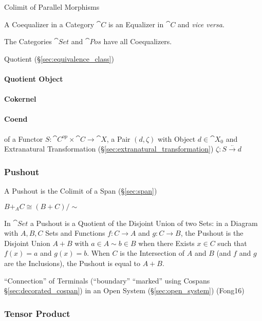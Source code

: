 Colimit of Parallel Morphisms

A Coequalizer in a Category $\cat{C}$ is an Equalizer in
$\cat{C}$ and \emph{vice versa}.

The Categories $\cat{Set}$ and $\cat{Pos}$ have all
Coequalizers.

Quotient (\S\ref{sec:equivalence_class})



\paragraph{Quotient Object}\label{sec:quotient_object}\hfill

\paragraph{Cokernel}\label{sec:cokernel}\hfill

\paragraph{Coend}\label{sec:coend}\hfill

of a Functor $S : \cat{C}^{op} \times \cat{C} \rightarrow
\cat{X}$, a Pair $(d, \zeta)$ with Object $d \in \cat{X}_0$ and
Extranatural Transformation (\S\ref{sec:extranatural_transformation})
$\zeta : S \xrightarrow{..} d$



\subsubsection{Pushout}\label{sec:pushout}

A Pushout is the Colimit of a Span (\S\ref{sec:span})

$B +_A C \cong (B + C)/\sim$

In $\cat{Set}$ a Pushout is a Quotient of the Disjoint Union of two
Sets: in a Diagram with $A,B,C$ Sets and Functions $f : C \rightarrow
A$ and $g : C \rightarrow B$, the Pushout is the Disjoint Union $A +
B$ with $a \in A \sim b \in B$ when there Exists $x \in C$ such that
$f(x) = a$ and $g(x) = b$. When $C$ is the Intersection of $A$ and $B$
(and $f$ and $g$ are the Inclusions), the Pushout is equal to $A + B$.

\fist ``Connection'' of Terminals (``boundary'' ``marked'' using
Cospans \S\ref{sec:decorated_cospan}) in an Open System
(\S\ref{sec:open_system}) (Fong16)



\subsubsection{Tensor Product}\label{sec:tensor_product}


